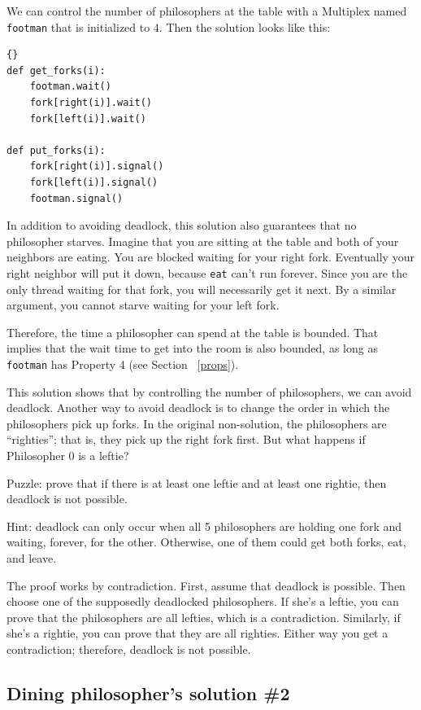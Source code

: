 \documentclass{book}
\newcommand{\clearemptydoublepage}{\newpage\cleardoublepage}
\begin{document}
We can control the number of philosophers at the table with
a Multiplex named {\tt footman} that is initialized to 4.
Then the solution looks like this:

\begin{lstlisting}[caption={Dining philosophers solution \#1}]{}
def get_forks(i):
    footman.wait()
    fork[right(i)].wait()
    fork[left(i)].wait()

def put_forks(i):
    fork[right(i)].signal()
    fork[left(i)].signal()
    footman.signal()
\end{lstlisting}

In addition to avoiding deadlock, this solution also guarantees that
no philosopher starves.
Imagine that you
are sitting at the table and both of your neighbors are eating.  You
are blocked waiting for your right fork.  Eventually your right
neighbor will put it down, because {\tt eat} can't run forever.  Since
you are the only thread waiting for that fork, you will necessarily
get it next.  By a similar argument, you cannot starve waiting for
your left fork.

Therefore, the time a philosopher can spend at the table is bounded.
That implies that the wait time to get into the room is also bounded,
as long as {\tt footman} has Property 4 (see Section ~\ref{props}).

This solution shows that
by controlling the number of philosophers, we can avoid deadlock.
Another way to avoid deadlock is to change the order in which the
philosophers pick up forks.  In the original non-solution, the
philosophers are ``righties''; that is, they pick up the right fork
first.  But what happens if Philosopher 0 is a leftie?

Puzzle: prove that if there is at least one leftie and at least one
rightie, then deadlock is not possible.

Hint: deadlock can only occur when all 5 philosophers are holding
one fork and waiting, forever, for the other.  Otherwise, one of
them could get both forks, eat, and leave.

The proof works by contradiction.  First, assume that deadlock is
possible.  Then choose one of the supposedly deadlocked philosophers.
If she's a leftie, you can prove that the philosophers are all
lefties, which is a contradiction.  Similarly, if she's a rightie, you
can prove that they are all righties.  Either way you get a
contradiction; therefore, deadlock is not possible.


\clearemptydoublepage
\subsection{Dining philosopher's solution \#2}
\end{document}
